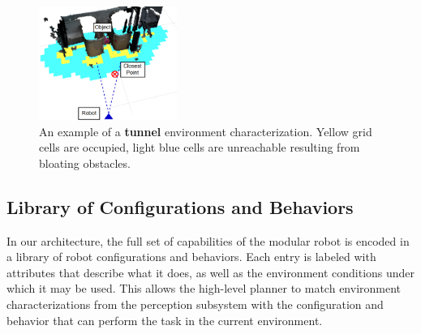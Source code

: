 \documentclass[conference]{IEEEtran}
\begin{document}
%
\begin{figure}
\begin{center}
\includegraphics[width=0.4\textwidth]{images/characterization.png}
\caption{An example of a \textbf{tunnel} environment characterization. Yellow grid cells are occupied, light blue cells are unreachable resulting from bloating obstacles.}
\label{fig:characterization}
\end{center}
\vspace{-2em}
\end{figure}

\subsection{Library of Configurations and Behaviors}
\label{sec:configuration-specifics}
%
In our architecture, the full set of capabilities of the modular robot is encoded in a library of robot configurations and behaviors.  Each entry is labeled with  attributes that describe what it does, as well as the environment conditions under which it may be used. This allows the high-level planner  to match environment characterizations from the perception subsystem with the configuration and behavior that can perform the task in the current environment.
\end{document}
